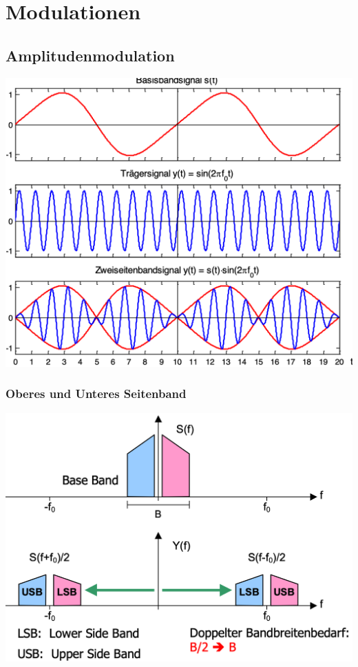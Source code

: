 
\section{Modulationen}

\subsection{Amplitudenmodulation}
\begin{center}
    \includegraphics[width=\linewidth]{graphic/fourier/Amplitudenmodulation.png}
\end{center}
\vspace{-8pt}

\subsubsection{Oberes und Unteres Seitenband}
\begin{center}
    \includegraphics[width=\linewidth]{graphic/fourier/Oberes und Unteres Seitenband.png}
\end{center}
\vspace{-8pt}

